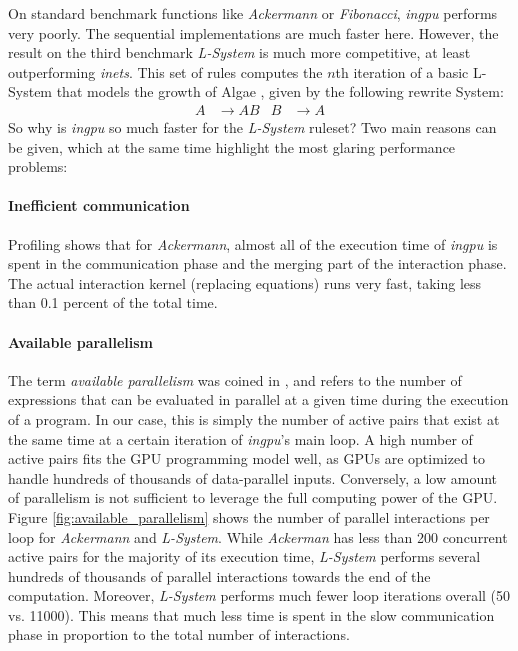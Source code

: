 \documentclass[submission,copyright,creativecommons]{eptcs}
\begin{document}
On standard benchmark functions like \emph{Ackermann} or \emph{Fibonacci},
\emph{ingpu} performs very poorly. The sequential implementations are much
faster here. However, the result on the third benchmark \emph{L-System} is much
more competitive, at least outperforming \emph{inets}. This set of rules
computes the $n$th iteration of a basic L-System that models the growth of Algae
\cite{wiki:l-system}, given by the following rewrite System:
\begin{align*}
A & \rightarrow AB & B & \rightarrow A
\end{align*}
So why is \emph{ingpu} so much faster for the \emph{L-System} ruleset?
Two main reasons can be given, which at the same time highlight the most glaring
performance problems:

\paragraph{\textbf{Inefficient communication}} Profiling
shows that for \emph{Ackermann}, almost all of the execution time of
\emph{ingpu} is spent in the communication phase and the merging part of the
interaction phase. The actual interaction kernel
(replacing equations) %
runs very fast, taking less than 0.1 percent of
the total time.

\paragraph{\textbf{Available parallelism}}
The term \emph{available parallelism} was coined in
\cite{DBLP:conf/ppopp/Mendez-LojoNPSHKBP10}, and refers to the number of
expressions that can be evaluated in parallel at a given time during the
execution of a program. In our case, this is simply the number
of active pairs that exist at the same time at a certain iteration of
\emph{ingpu}'s main loop. A high number of active pairs fits the GPU
programming model well, as GPUs are optimized to handle hundreds of thousands of
data-parallel inputs. Conversely, a low amount of parallelism is not sufficient
to leverage the full computing power of the GPU. Figure
\ref{fig:available_parallelism} shows the number of parallel
interactions per loop for \emph{Ackermann} and \emph{L-System}. While
\emph{Ackerman} has less than 200 concurrent active pairs for the majority of
its execution time, \emph{L-System} performs several hundreds of thousands of
parallel interactions towards the end of the computation. Moreover,
\emph{L-System} performs much fewer loop iterations overall (50 vs. 11000). This
means that much less time is spent in the slow communication phase in
proportion to the total number of interactions.
\end{document}
